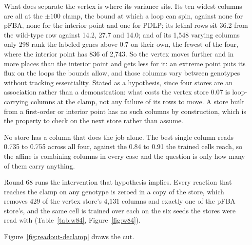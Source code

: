 What does separate the vertex is where its variance sits. Its ten widest columns are
all at the $\pm100$ clamp, the bound at which a loop can spin, against none for pFBA,
none for the interior point and one for PDLP; its lethal rows sit 36.2 from the
wild-type row against 14.2, 27.7 and 14.0; and of its 1,548 varying columns only 298
rank the labeled genes above 0.7 on their own, the fewest of the four, where the
interior point has 836 of 2,743. So the vertex moves further and in more places than
the interior point and gets less for it: an extreme point puts its flux on the loops
the bounds allow, and those columns vary between genotypes without tracking
essentiality. Stated as a hypothesis, since four stores are an association rather than
a demonstration: what costs the vertex store 0.07 is loop-carrying columns at the
clamp, not any failure of its rows to move. A store built from a first-order or
interior point has no such columns by construction, which is the property to check on
the next store rather than assume.

No store has a column that does the job alone. The best single column reads 0.735 to
0.755 across all four, against the 0.84 to 0.91 the trained cells reach, so the affine
is combining columns in every case and the question is only how many of them carry
anything.

Round 68 runs the intervention that hypothesis implies. Every reaction that reaches the
clamp on any genotype is zeroed in a copy of the store, which removes 429 of the vertex
store's 4,131 columns and exactly one of the pFBA store's, and the same cell is trained
over each on the six seeds the stores were read with
(Table~\ref{tab:w84}, Figure~\ref{fig:w84}).

Figure~\ref{fig:readout-declamp} draws the cut.





